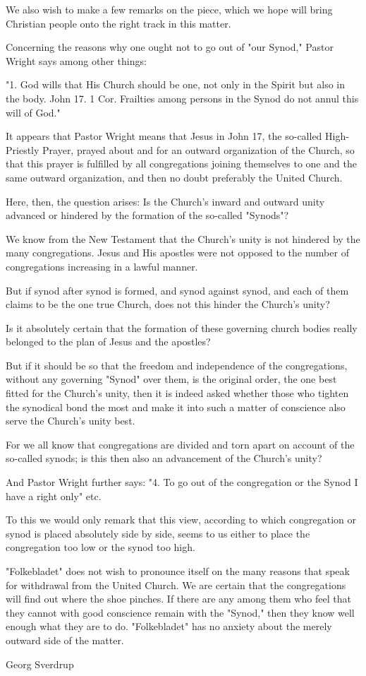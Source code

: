 We also wish to make a few remarks on the piece, which we hope will bring Christian people onto the right track in this matter.

Concerning the reasons why one ought not to go out of "our Synod," Pastor Wright says among other things:

"1. God wills that His Church should be one, not only in the Spirit but also in the body. John 17. 1 Cor. Frailties among persons in the Synod do not annul this will of God."

It appears that Pastor Wright means that Jesus in John 17, the so-called High-Priestly Prayer, prayed about and for an outward organization of the Church, so that this prayer is fulfilled by all congregations joining themselves to one and the same outward organization, and then no doubt preferably the United Church.

Here, then, the question arises:
Is the Church’s inward and outward unity advanced or hindered by the formation of the so-called "Synods"?

We know from the New Testament that the Church’s unity is not hindered by the many congregations. Jesus and His apostles were not opposed to the number of congregations increasing in a lawful manner.

But if synod after synod is formed, and synod against synod, and each of them claims to be the one true Church, does not this hinder the Church’s unity?

Is it absolutely certain that the formation of these governing church bodies really belonged to the plan of Jesus and the apostles?

But if it should be so that the freedom and independence of the congregations, without any governing "Synod" over them, is the original order, the one best fitted for the Church’s unity, then it is indeed asked whether those who tighten the synodical bond the most and make it into such a matter of conscience also serve the Church’s unity best.

For we all know that congregations are divided and torn apart on account of the so-called synods; is this then also an advancement of the Church’s unity?

And Pastor Wright further says:
"4. To go out of the congregation or the Synod I have a right only" etc.

To this we would only remark that this view, according to which congregation or synod is placed absolutely side by side, seems to us either to place the congregation too low or the synod too high.

"Folkebladet" does not wish to pronounce itself on the many reasons that speak for withdrawal from the United Church. We are certain that the congregations will find out where the shoe pinches. If there are any among them who feel that they cannot with good conscience remain with the "Synod," then they know well enough what they are to do. "Folkebladet" has no anxiety about the merely outward side of the matter.

Georg Sverdrup

